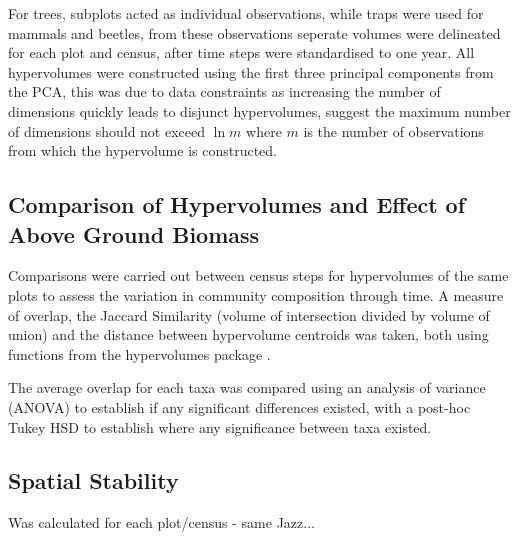 	For trees, subplots acted as individual observations, while traps were used for mammals and beetles, from these observations seperate volumes were delineated for each plot and census, after time steps were standardised to one year. All hypervolumes were constructed using the first three principal components from the PCA, this was due to data constraints as increasing the number of dimensions quickly leads to disjunct hypervolumes, \cite{Blonder2017b} suggest the maximum number of dimensions should not exceed $\ln m$ where $m$ is the number of observations from which the hypervolume is constructed.

\subsection{Comparison of Hypervolumes and Effect of Above Ground Biomass}

Comparisons were carried out between census steps for hypervolumes of the same plots to assess the variation in community composition through time. A measure of overlap, the Jaccard Similarity (volume of intersection divided by volume of union) and the distance between hypervolume centroids was taken, both using functions from the hypervolumes package \citep{Blonder2017a}.

	The average overlap for each taxa was compared using an analysis of variance (ANOVA) to establish if any significant differences existed, with a post-hoc Tukey HSD to establish where any significance between taxa existed. 






\subsection{Spatial Stability}
Was calculated for each plot/census - same Jazz...
\\
\\
\\
